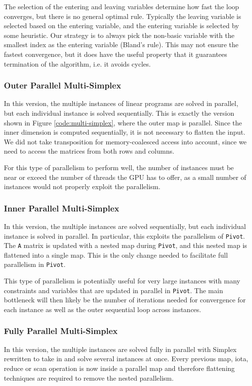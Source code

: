 The selection of the entering and leaving variables determine how fast the loop converges, but there is no general optimal rule. Typically the leaving variable is selected based on the entering variable, and the entering variable is selected by some heuristic. Our strategy is to always pick the non-basic variable with the smallest index as the entering variable (Bland's rule). This may not ensure the fastest convergence, but it does have the useful property that it guarantees termination of the algorithm, i.e. it avoids cycles.

\subsubsection{Outer Parallel Multi-Simplex}
In this version, the multiple instances of linear programs are solved in parallel, but each individual instance is solved sequentially. This is exactly the version shown in Figure \ref{code:multi-simplex}, where the outer map is parallel. Since the inner dimension is computed sequentially, it is not necessary to flatten the input. We did not take transposition for memory-coalesced access into account, since we need to access the matrices from both rows and columns.

For this type of parallelism to perform well, the number of instances must be near or exceed the number of threads the GPU has to offer, as a small number of instances would not properly exploit the parallelism.

\subsubsection{Inner Parallel Multi-Simplex}
In this version, the multiple instances are solved sequentially, but each individual instance is solved in parallel. In particular, this exploits the parallelism of \texttt{Pivot}. The \texttt{A} matrix is updated with a nested map during \texttt{Pivot}, and this nested map is flattened into a single map. This is the only change needed to facilitate full parallelism in \texttt{Pivot}.

This type of parallelism is potentially useful for very large instances with many constraints and variables that are updated in parallel in \texttt{Pivot}. The main bottleneck will then likely be the number of iterations needed for convergence for each instance as well as the outer sequential loop across instances.

\subsubsection{Fully Parallel Multi-Simplex}
In this version, the multiple instances are solved fully in parallel with Simplex rewritten to take in and solve several instances at once. Every previous map, iota, reduce or scan operation is now inside a parallel map and therefore flattening techniques are required to remove the nested parallelism.

